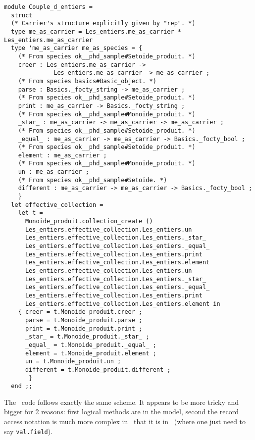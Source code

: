 {\begin{lstlisting}[language=MyOCaml]
module Couple_d_entiers =
  struct
  (* Carrier's structure explicitly given by "rep". *)
  type me_as_carrier = Les_entiers.me_as_carrier * Les_entiers.me_as_carrier
  type 'me_as_carrier me_as_species = {
    (* From species ok__phd_sample#Setoide_produit. *)
    creer : Les_entiers.me_as_carrier ->
              Les_entiers.me_as_carrier -> me_as_carrier ;
    (* From species basics#Basic_object. *)
    parse : Basics._focty_string -> me_as_carrier ;
    (* From species ok__phd_sample#Setoide_produit. *)
    print : me_as_carrier -> Basics._focty_string ;
    (* From species ok__phd_sample#Monoide_produit. *)
    _star_ : me_as_carrier -> me_as_carrier -> me_as_carrier ;
    (* From species ok__phd_sample#Setoide_produit. *)
    _equal_ : me_as_carrier -> me_as_carrier -> Basics._focty_bool ;
    (* From species ok__phd_sample#Setoide_produit. *)
    element : me_as_carrier ;
    (* From species ok__phd_sample#Monoide_produit. *)
    un : me_as_carrier ;
    (* From species ok__phd_sample#Setoide. *)
    different : me_as_carrier -> me_as_carrier -> Basics._focty_bool ;
    }
  let effective_collection =
    let t =
      Monoide_produit.collection_create ()
      Les_entiers.effective_collection.Les_entiers.un
      Les_entiers.effective_collection.Les_entiers._star_
      Les_entiers.effective_collection.Les_entiers._equal_
      Les_entiers.effective_collection.Les_entiers.print
      Les_entiers.effective_collection.Les_entiers.element
      Les_entiers.effective_collection.Les_entiers.un
      Les_entiers.effective_collection.Les_entiers._star_
      Les_entiers.effective_collection.Les_entiers._equal_
      Les_entiers.effective_collection.Les_entiers.print
      Les_entiers.effective_collection.Les_entiers.element in
    { creer = t.Monoide_produit.creer ;
      parse = t.Monoide_produit.parse ;
      print = t.Monoide_produit.print ;
      _star_ = t.Monoide_produit._star_ ;
      _equal_ = t.Monoide_produit._equal_ ;
      element = t.Monoide_produit.element ;
      un = t.Monoide_produit.un ;
      different = t.Monoide_produit.different ;
       }
  end ;;
\end{lstlisting}
}

The \coq\ code follows exactly the same scheme. It appears to be more
tricky and bigger for 2 reasons: first logical methods are in the
model, second the record access notation is much more complex in
\coq\ that it is in \ocaml\ (where one just need to say
{\tt val.field}).

